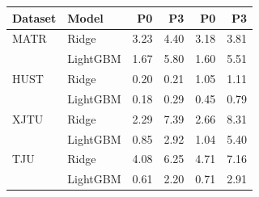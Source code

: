 \begin{tabular}{llrrrr}
\toprule
Dataset & Model & P0 & P3 & P0  & P3  \\
\midrule
MATR & Ridge & 3.23 & 4.40 & 3.18 & 3.81 \\
 & LightGBM & 1.67 & 5.80 & 1.60 & 5.51 \\
HUST & Ridge & 0.20 & 0.21 & 1.05 & 1.11 \\
 & LightGBM & 0.18 & 0.29 & 0.45 & 0.79 \\
XJTU & Ridge & 2.29 & 7.39 & 2.66 & 8.31 \\
 & LightGBM & 0.85 & 2.92 & 1.04 & 5.40 \\
TJU & Ridge & 4.08 & 6.25 & 4.71 & 7.16 \\
 & LightGBM & 0.61 & 2.20 & 0.71 & 2.91 \\
\bottomrule
\end{tabular}
